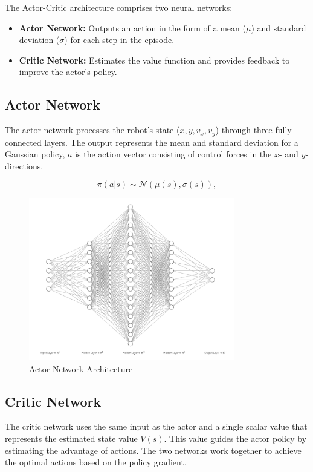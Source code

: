 \documentclass[12pt]{article}
\begin{document}
The Actor-Critic architecture comprises two neural networks:
\begin{itemize}
    \item \textbf{Actor Network:} Outputs an action in the form of a mean (\(\mu\)) and standard deviation (\(\sigma\)) for each step in the episode.
    \item \textbf{Critic Network:} Estimates the value function and provides feedback to improve the actor's policy.
\end{itemize}

\subsection{Actor Network}
The actor network processes the robot's state (\(x, y, v_x, v_y\)) through three fully connected layers. The output represents the mean and standard deviation for a Gaussian policy, \(a\) is the action vector consisting of control forces in the \(x\)- and \(y\)-directions.

\begin{equation}
\pi(a|s) \sim \mathcal{N}(\mu(s), \sigma(s)),
\end{equation}

\begin{figure}[H]
    \centering
    \includegraphics[width=0.8\textwidth]{report/images/nn.png}
    \caption{Actor Network Architecture}
    \label{fig:actor_network}
\end{figure}

\subsection{Critic Network}
The critic network uses the same input as the actor and a single scalar value that represents the estimated state value \(V(s)\). This value guides the actor policy by estimating the advantage of actions. The two networks work together to achieve the optimal actions based on the policy gradient.
\end{document}
